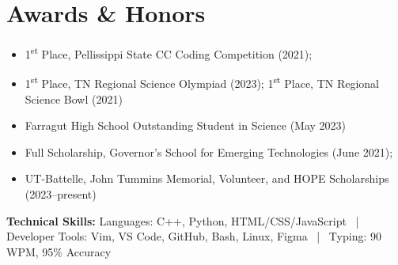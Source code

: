 \documentclass[11pt,a4paper]{article}
\begin{document}

\section*{Awards \& Honors}
\begin{itemize}[leftmargin=*, topsep=0pt, itemsep=2pt, parsep=0pt]
  \item 1\textsuperscript{st} Place, Pellissippi State CC Coding Competition (2021);
  \item 1\textsuperscript{st} Place, TN Regional Science Olympiad (2023); 1\textsuperscript{st} Place, TN Regional Science Bowl (2021)
  \item Farragut High School Outstanding Student in Science (May 2023)
  \item Full Scholarship, Governor’s School for Emerging Technologies (June 2021); 
  \item UT-Battelle, John Tummins Memorial, Volunteer, and HOPE Scholarships (2023–present)
\end{itemize}

\textbf{Technical Skills: }
Languages: C++, Python, HTML/CSS/JavaScript ~|~ 
Developer Tools: Vim, VS Code, GitHub, Bash, Linux, Figma ~|~ 
Typing: 90 WPM, 95\% Accuracy

\end{document}
